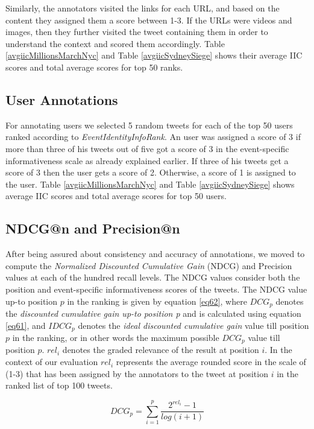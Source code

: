 Similarly, the annotators visited the links for each URL, and based on the content they assigned them a score between 1-3. If the URLs were videos and images, then they further visited the tweet containing them in order to understand the context and scored them accordingly. Table \ref{avgiicMillionsMarchNyc} and Table \ref{avgiicSydneySiege} shows their average IIC scores and total average scores for top 50 ranks. 

\subsection{User Annotations} 
For annotating users we selected 5 random tweets for each of the top 50 users ranked according to \textit{EventIdentityInfoRank}. An user was assigned a score of 3 if more than three of his tweets out of five got a score of 3 in the event-specific informativeness scale as already explained earlier. If three of his tweets get a score of 3 then the user gets a score of 2. Otherwise, a score of 1 is assigned to the user. Table \ref{avgiicMillionsMarchNyc} and Table \ref{avgiicSydneySiege} shows average IIC scores and total average scores for top 50 users.

 
\subsection{NDCG@n and Precision@n}
After being assured about consistency and accuracy of annotations, we moved to compute the \textit{Normalized Discounted Cumulative Gain} (NDCG) \cite{jarvelin2002cumulated} and Precision \cite{baeza1999modern} values at each of the hundred recall levels. The NDCG values consider both the position and event-specific informativeness scores of the tweets. The NDCG value up-to position $p$ in the ranking is given by equation \ref{eq62}, where $DCG_{p}$ denotes the \textit{discounted cumulative gain up-to position p} and is calculated using equation \ref{eq61}, and $IDCG_{p}$ denotes the \textit{ideal discounted cumulative gain} value till position $p$ in the ranking, or in other words the maximum possible $DCG_{p}$ value till position $p$. $rel_{i}$ denotes the graded relevance of the result at position $i$. In the context of our evaluation $rel_{i}$ represents the average rounded score in the scale of (1-3) that has been assigned by the annotators to the tweet at position  $i$ in the ranked list of top 100 tweets.

\begin{equation}
\label{eq61}
DCG_{p} = \sum_{i=1}^{p}\frac{2^{rel_{i}}-1}{log(i+1)}
\end{equation}

